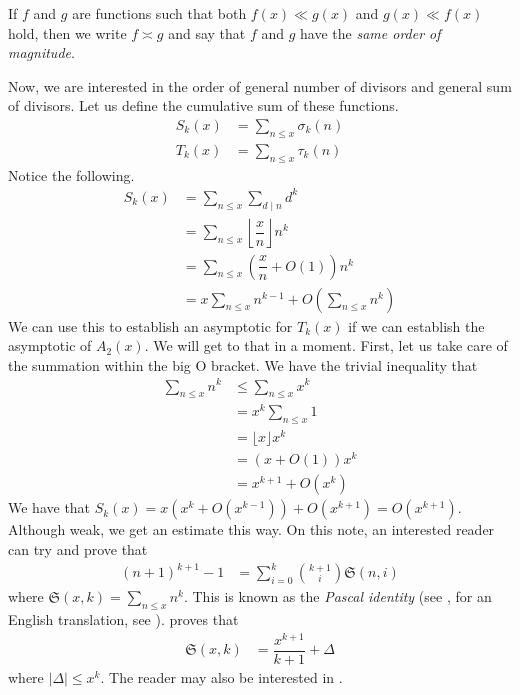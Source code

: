 \documentclass[elemannt.tex]{subfile}
\begin{document}
		\begin{definition}
			If $f$ and $g$ are functions such that both $f(x)\ll g(x)$ and $g(x)\ll f(x)$ hold, then we write $f\asymp g$ and say that $f$ and $g$ have the \textit{same order of magnitude}.
		\end{definition}\par
	Now, we are interested in the order of general number of divisors and general sum of divisors. Let us define the cumulative sum of these functions.
		\begin{align*}
			S_{k}(x)
				& = \sum_{n\leq x}\sigma_{k}(n)\\
			T_{k}(x)
				& = \sum_{n\leq x}\tau_{k}(n)
		\end{align*}
	Notice the following.
		\begin{align*}
			S_{k}(x)
				& = \sum_{n\leq x}\sum_{d\mid n}d^{k}\\
				& = \sum_{n\leq x}\left\lfloor{\dfrac{x}{n}}\right\rfloor n^{k}\\
				& = \sum_{n\leq x}\left(\dfrac{x}{n}+O(1)\right)n^{k}\\
				& = x\sum_{n\leq x}n^{k-1}+O\left(\sum_{n\leq x}n^{k}\right)
		\end{align*}
	We can use this to establish an asymptotic for $T_{k}(x)$ if we can establish the asymptotic of $A_{2}(x)$. We will get to that in a moment. First, let us take care of the summation within the big O bracket. We have the trivial inequality that
		\begin{align*}
			\sum_{n\leq x}n^{k}
				& \leq \sum_{n\leq x}x^{k}\\
				& = x^{k}\sum_{n\leq x}1\\
				& = \lfloor{x}\rfloor x^{k}\\
				& = (x+O(1))x^{k}\\
				& = x^{k+1}+O(x^{k})
		\end{align*}
	We have that $S_{k}(x)=x\left(x^{k}+O(x^{k-1})\right)+O(x^{k+1})=O(x^{k+1})$. Although weak, we get an estimate this way. On this note, an interested reader can try and prove that
		\begin{align*}
			(n+1)^{k+1}-1
				& =\sum_{i=0}^{k}\binom{k+1}{i}\mathfrak{S}(n,i)
		\end{align*}
	where $\mathfrak{S}(x,k)=\sum_{n\leq x}n^{k}$. This is known as the \textit{Pascal identity} (see \textcite{pascal_1964}, for an English translation, see \textcite{knoebel_laubenbacher_lodder_pengelley_2007}). \textcite[Chapter II, Theorem $1$]{lehmer_1900} proves that
		\begin{align}
			\mathfrak{S}(x,k)
				& = \dfrac{x^{k+1}}{k+1}+\Delta\label{eqn:lehmers}
		\end{align}
	where $|\Delta|\leq x^{k}$. The reader may also be interested in \textcite{kieren_macmillan_jonathan_sondow_2011}.
\end{document}
